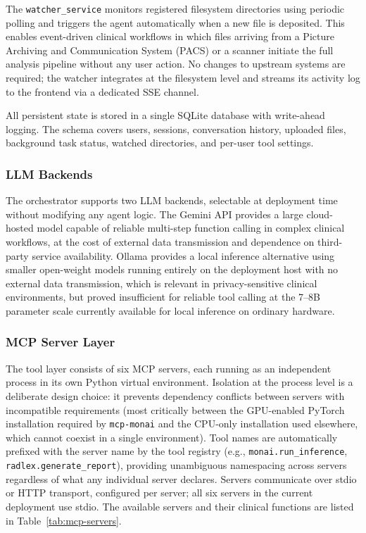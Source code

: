 \documentclass[conference]{IEEEtran}
\begin{document}
The \texttt{watcher\_service} monitors registered filesystem
directories using periodic polling and triggers the agent automatically
when a new file is deposited.
This enables event-driven clinical
workflows in which files arriving from a Picture Archiving and Communication System (PACS) or a scanner
initiate the full analysis pipeline without any user action. No changes
to upstream systems are required; the watcher integrates at the
filesystem level and streams its activity log to the frontend via a
dedicated SSE channel.

All persistent state is stored in a single SQLite database with write-ahead logging. The schema covers users, sessions, conversation history,
uploaded files, background task status, watched directories, and
per-user tool settings.

\subsubsection*{LLM Backends}
The orchestrator supports two LLM backends, selectable at deployment
time without modifying any agent logic.
The Gemini API provides a
large cloud-hosted model capable of reliable multi-step function
calling in complex clinical workflows, at the cost of external data
transmission and dependence on third-party service availability.
Ollama provides a local inference
alternative using smaller open-weight models running entirely on the
deployment host with no external data transmission, which is relevant
in privacy-sensitive clinical environments, but proved insufficient for
reliable tool calling at the 7--8B parameter scale currently available
for local inference on ordinary hardware.

\subsubsection*{MCP Server Layer}
The tool layer consists of six MCP servers, each running as an
independent process in its own Python virtual environment.
Isolation at the process level is a deliberate design choice: it
prevents dependency conflicts between servers with incompatible
requirements (most critically between the GPU-enabled PyTorch
installation required by \texttt{mcp-monai} and the CPU-only
installation used elsewhere, which cannot coexist in a single
environment).
Tool names are automatically prefixed with the server name by the tool registry
(e.g., \texttt{monai.run\_inference}, \texttt{radlex.generate\_report}),
providing unambiguous namespacing across servers regardless of what any individual server declares.
Servers communicate over stdio or HTTP transport, configured per server; all six servers in the current deployment use stdio. The available servers and their
clinical functions are listed in Table~\ref{tab:mcp-servers}.
\end{document}
